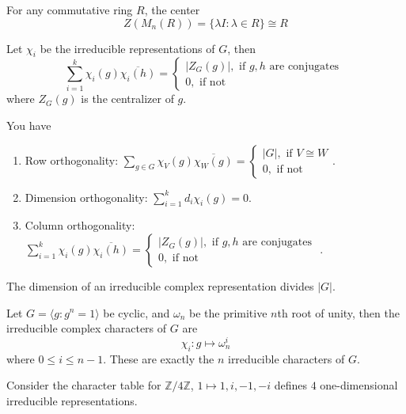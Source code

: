 \documentclass[openany]{book}
\newcommand{\Z}{\mathbb{Z}}
\newcommand{\la}{\langle}
\newcommand{\ra}{\rangle}
\newcommand{\om}{\omega}
\begin{document}
\begin{prop}
    For any commutative ring $R$, the center 
    \begin{equation*}
        Z(M_n(R))=\{\lambda I: \lambda\in R\}\cong R
    \end{equation*}
\end{prop}


\begin{prop}
    Let $\chi_i$ be the irreducible representations of $G$, then 
    \begin{equation*}
        \sum_{i=1}^k\chi_i(g)\overline{\chi_i(h)}=\begin{cases}
            |Z_G(g)|, \text{ if $g,h$ are conjugates } \\
            0, \text{ if not}
        \end{cases}
    \end{equation*}
    where $Z_G(g)$ is the centralizer of $g$.
\end{prop}


\begin{prop}
You have
    \begin{enumerate}
    \item Row orthogonality: $\sum_{g\in G}\chi_V(g)\overline{\chi_W(g)}=\begin{cases}
        |G|, \text{ if $V\cong W$}\\
        0, \text{ if not}
    \end{cases}$.
    \item Dimension orthogonality: $\sum_{i=1}^kd_i\chi_i(g)=0$.
    \item Column orthogonality: $\sum_{i=1}^k\chi_i(g)\overline{\chi_i(h)}=\begin{cases}
        |Z_G(g)|, \text{ if $g,h$ are conjugates } \\
        0, \text{ if not}
    \end{cases}$.
\end{enumerate}
\end{prop}


\begin{prop}
    The dimension of an irreducible complex representation divides $|G|$.
\end{prop}


\begin{prop}
    Let $G=\la g: g^n=1\ra$ be cyclic, and $\om_n$ be the primitive $n$th root of unity, then the irreducible complex characters of $G$ are 
    \begin{equation*}
        \chi_i: g\mapsto \om_n^i
    \end{equation*}
    where $0\leq i\leq n-1$. These are exactly the $n$ irreducible characters of $G$.
\end{prop}
\begin{example}
    Consider the character table for $\Z/4\Z$, $1\mapsto 1, i, -1, -i$ defines $4$ one-dimensional irreducible representations.
\end{example}
\end{document}
